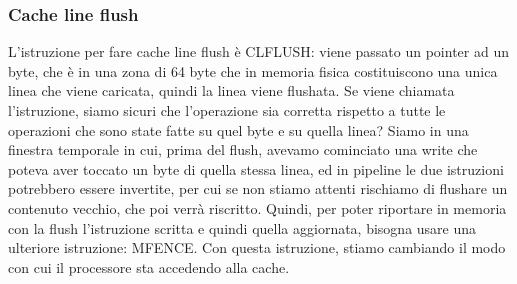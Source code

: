 \documentclass[14pt, oneside]{book}
\begin{document}
\subsubsection{Cache line flush}
L'istruzione per fare cache line flush è CLFLUSH: viene passato un pointer ad un byte, che è in una zona di 64 byte che in memoria fisica costituiscono una unica linea che viene caricata, quindi la linea viene flushata. Se viene chiamata l'istruzione, siamo sicuri che l'operazione sia corretta rispetto a tutte le operazioni che sono state fatte su quel byte e su quella linea? Siamo in una finestra temporale in cui, prima del flush, avevamo cominciato una write che poteva aver toccato un byte di quella stessa linea, ed in pipeline le due istruzioni potrebbero essere invertite, per cui se non stiamo attenti rischiamo di flushare un contenuto vecchio, che poi verrà riscritto. Quindi, per poter riportare in memoria con la flush l'istruzione scritta e quindi quella aggiornata, bisogna usare una ulteriore istruzione: MFENCE. Con questa istruzione, stiamo cambiando il modo con cui il processore sta accedendo alla cache.
\end{document}
